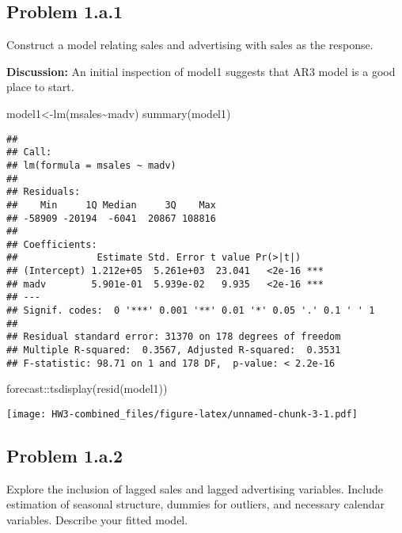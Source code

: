 \documentclass[
]{article}
\newenvironment{Shaded}{\begin{snugshade}}{\end{snugshade}}
\newcommand{\FunctionTok}[1]{\textcolor[rgb]{0.00,0.00,0.00}{#1}}
\newcommand{\NormalTok}[1]{#1}
\newcommand{\OtherTok}[1]{\textcolor[rgb]{0.56,0.35,0.01}{#1}}
\newcommand{\SpecialCharTok}[1]{\textcolor[rgb]{0.00,0.00,0.00}{#1}}
\begin{document}
\hypertarget{problem-1.a.1}{%
\subsection{Problem 1.a.1}\label{problem-1.a.1}}

Construct a model relating sales and advertising with sales as the
response.

\textbf{Discussion:} An initial inspection of model1 suggests that AR3
model is a good place to start.

\begin{Shaded}
\begin{Highlighting}[]
\NormalTok{model1}\OtherTok{\textless{}{-}}\FunctionTok{lm}\NormalTok{(msales}\SpecialCharTok{\textasciitilde{}}\NormalTok{madv)}
\FunctionTok{summary}\NormalTok{(model1)}
\end{Highlighting}
\end{Shaded}

\begin{verbatim}
## 
## Call:
## lm(formula = msales ~ madv)
## 
## Residuals:
##    Min     1Q Median     3Q    Max 
## -58909 -20194  -6041  20867 108816 
## 
## Coefficients:
##              Estimate Std. Error t value Pr(>|t|)    
## (Intercept) 1.212e+05  5.261e+03  23.041   <2e-16 ***
## madv        5.901e-01  5.939e-02   9.935   <2e-16 ***
## ---
## Signif. codes:  0 '***' 0.001 '**' 0.01 '*' 0.05 '.' 0.1 ' ' 1
## 
## Residual standard error: 31370 on 178 degrees of freedom
## Multiple R-squared:  0.3567, Adjusted R-squared:  0.3531 
## F-statistic: 98.71 on 1 and 178 DF,  p-value: < 2.2e-16
\end{verbatim}

\begin{Shaded}
\begin{Highlighting}[]
\NormalTok{forecast}\SpecialCharTok{::}\FunctionTok{tsdisplay}\NormalTok{(}\FunctionTok{resid}\NormalTok{(model1))}
\end{Highlighting}
\end{Shaded}

\texttt{[image: HW3-combined\_files/figure-latex/unnamed-chunk-3-1.pdf]}

\hypertarget{problem-1.a.2}{%
\subsection{Problem 1.a.2}\label{problem-1.a.2}}

Explore the inclusion of lagged sales and lagged advertising variables.
Include estimation of seasonal structure, dummies for outliers, and
necessary calendar variables. Describe your fitted model.
\end{document}
